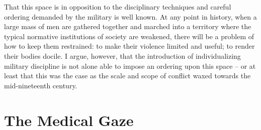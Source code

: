 \documentclass{report}
\begin{document}
  That this space is in opposition to the disciplinary techniques and careful ordering demanded by the military is well known. At any point
  in history, when a large mass of men are gathered together and marched into a territory where the typical normative institutions
  of society are weakened, there will be a problem of how to keep them restrained: to make their violence limited and useful; to render their
  bodies docile. I argue, however, that the introduction of individualizing military discipline is not alone able to impose an ordering upon
  this space -- or at least that this was the case as the scale and scope of conflict waxed towards the mid-nineteenth century.

  \section{The Medical Gaze}\label{sec:the_medical_gaze} %
  

  \newpage
  \printbibliography
 
\end{document}
